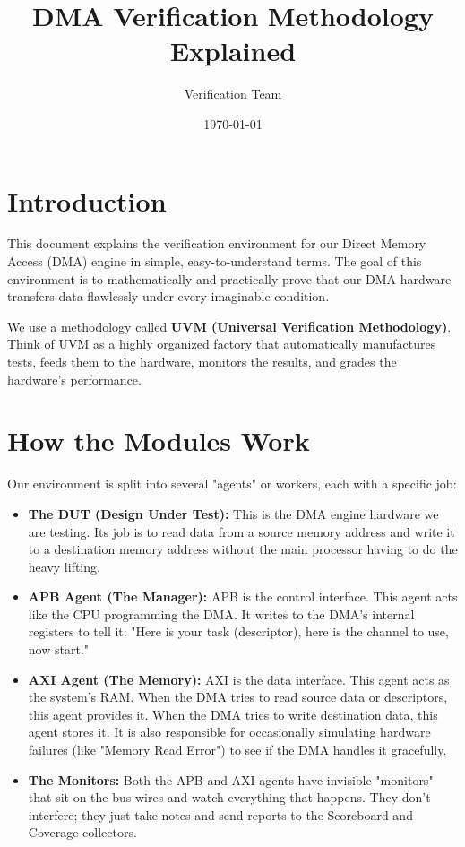 \documentclass[12pt]{article}
\title{\textbf{DMA Verification Methodology Explained}}
\author{Verification Team}
\date{\today}
\begin{document}
\maketitle

\section*{Introduction}
This document explains the verification environment for our Direct Memory Access (DMA) engine in simple, easy-to-understand terms. The goal of this environment is to mathematically and practically prove that our DMA hardware transfers data flawlessly under every imaginable condition. 

We use a methodology called \textbf{UVM (Universal Verification Methodology)}. Think of UVM as a highly organized factory that automatically manufactures tests, feeds them to the hardware, monitors the results, and grades the hardware's performance.

\section*{How the Modules Work}
Our environment is split into several "agents" or workers, each with a specific job:

\begin{itemize}
    \item \textbf{The DUT (Design Under Test):} This is the DMA engine hardware we are testing. Its job is to read data from a source memory address and write it to a destination memory address without the main processor having to do the heavy lifting.
    
    \item \textbf{APB Agent (The Manager):} APB is the control interface. This agent acts like the CPU programming the DMA. It writes to the DMA's internal registers to tell it: "Here is your task (descriptor), here is the channel to use, now start."
    
    \item \textbf{AXI Agent (The Memory):} AXI is the data interface. This agent acts as the system's RAM. When the DMA tries to read source data or descriptors, this agent provides it. When the DMA tries to write destination data, this agent stores it. It is also responsible for occasionally simulating hardware failures (like "Memory Read Error") to see if the DMA handles it gracefully.
    
    \item \textbf{The Monitors:} Both the APB and AXI agents have invisible "monitors" that sit on the bus wires and watch everything that happens. They don't interfere; they just take notes and send reports to the Scoreboard and Coverage collectors.
\end{itemize}
\end{document}
